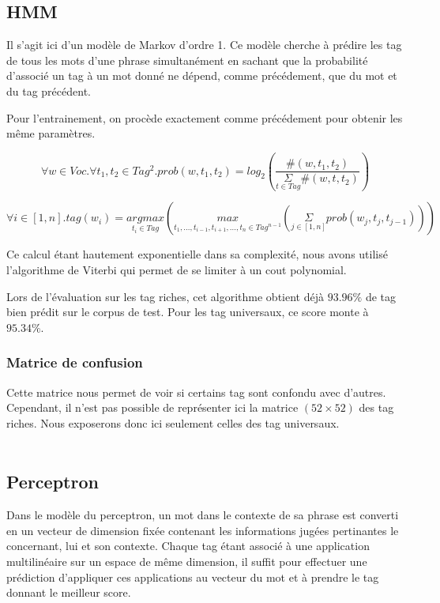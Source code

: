 \documentclass{article}
\begin{document}
\subsection{HMM}

Il s'agit ici d'un modèle de Markov d'ordre 1. Ce modèle cherche à prédire les tag de tous les mots d'une phrase simultanément en sachant que la probabilité d'associé un tag à un mot donné ne dépend, comme précédement, que du mot et du tag précédent.

Pour l'entrainement, on procède exactement comme précédement pour obtenir les même paramètres.

$$\forall w \in Voc . \forall t_1,t_2 \in Tag^2 . prob(w,t_1,t_2) = log_2 \left( \frac{\#(w,t_1,t_2)}{\underset{t \in Tag}{\Sigma}\#(w,t,t_2)} \right) $$



$$\forall i \in [1,n] . tag(w_i) = \underset{t_i \in Tag}{argmax} \left( \underset{t_1,...,t_{i-1},t_{i+1},...,t_n \in Tag^{n-1}}{max} \left( \underset{j \in [1,n]}{\Sigma}            prob(w_j,t_j,t_{j-1})            \right) \right)$$

Ce calcul étant hautement exponentielle dans sa complexité, nous avons utilisé l'algorithme de Viterbi qui permet de se limiter à un cout polynomial.

Lors de l'évaluation sur les tag riches, cet algorithme obtient déjà $93.96\%$ de tag bien prédit sur le corpus de test. Pour les tag universaux, ce score monte à $95.34\%$. 

\subsubsection{Matrice de confusion}

Cette matrice nous permet de voir si certains tag sont confondu avec d'autres. Cependant, il n'est pas possible de représenter ici la matrice $(52 \times 52)$ des tag riches. Nous exposerons donc ici seulement celles des tag universaux.

$$
\begin{array}{l|c|c|c|c|c|c|c|c|c|c|c|c}

\end{array}
$$

\subsection{Perceptron}

Dans le modèle du perceptron, un mot dans le contexte de sa phrase est converti en un vecteur de dimension fixée contenant les informations jugées pertinantes le concernant, lui et son contexte. Chaque tag étant associé à une application multilinéaire sur un espace de même dimension, il suffit pour effectuer une prédiction d'appliquer ces applications au vecteur du mot et à prendre le tag donnant le meilleur score.
\end{document}
